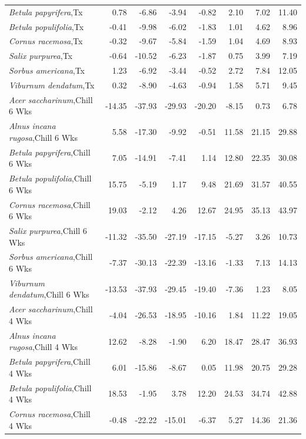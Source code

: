 \documentclass{article}\usepackage[]{graphicx}\usepackage[]{color}
\begin{document}
\begin{longtable}{lrrrrrrr}
  \textit{Betula papyrifera},Tx & 0.78 & -6.86 & -3.94 & -0.82 & 2.10 & 7.02 & 11.40 \\ 
  \textit{Betula populifolia},Tx & -0.41 & -9.98 & -6.02 & -1.83 & 1.01 & 4.62 & 8.96 \\ 
  \textit{Cornus racemosa},Tx & -0.32 & -9.67 & -5.84 & -1.59 & 1.04 & 4.69 & 8.93 \\ 
  \textit{Salix purpurea},Tx & -0.64 & -10.52 & -6.23 & -1.87 & 0.75 & 3.99 & 7.19 \\ 
  \textit{Sorbus americana},Tx & 1.23 & -6.92 & -3.44 & -0.52 & 2.72 & 7.84 & 12.05 \\ 
  \textit{Viburnum dendatum},Tx & 0.32 & -8.90 & -4.63 & -0.94 & 1.58 & 5.71 & 9.45 \\ 
  \textit{Acer saccharinum},Chill 6 Wks & -14.35 & -37.93 & -29.93 & -20.20 & -8.15 & 0.73 & 6.78 \\ 
  \textit{Alnus incana rugosa},Chill 6 Wks & 5.58 & -17.30 & -9.92 & -0.51 & 11.58 & 21.15 & 29.88 \\ 
  \textit{Betula papyrifera},Chill 6 Wks & 7.05 & -14.91 & -7.41 & 1.14 & 12.80 & 22.35 & 30.08 \\ 
  \textit{Betula populifolia},Chill 6 Wks & 15.75 & -5.19 & 1.17 & 9.48 & 21.69 & 31.57 & 40.55 \\ 
  \textit{Cornus racemosa},Chill 6 Wks & 19.03 & -2.12 & 4.26 & 12.67 & 24.95 & 35.13 & 43.97 \\ 
  \textit{Salix purpurea},Chill 6 Wks & -11.32 & -35.50 & -27.19 & -17.15 & -5.27 & 3.26 & 10.73 \\ 
  \textit{Sorbus americana},Chill 6 Wks & -7.37 & -30.13 & -22.39 & -13.16 & -1.33 & 7.13 & 14.13 \\ 
  \textit{Viburnum dendatum},Chill 6 Wks & -13.53 & -37.93 & -29.45 & -19.40 & -7.36 & 1.23 & 8.05 \\ 
  \textit{Acer saccharinum},Chill 4 Wks & -4.04 & -26.53 & -18.95 & -10.16 & 1.84 & 11.22 & 19.05 \\ 
  \textit{Alnus incana rugosa},Chill 4 Wks & 12.62 & -8.28 & -1.90 & 6.20 & 18.47 & 28.47 & 36.93 \\ 
  \textit{Betula papyrifera},Chill 4 Wks & 6.01 & -15.86 & -8.67 & 0.05 & 11.98 & 20.75 & 29.28 \\ 
  \textit{Betula populifolia},Chill 4 Wks & 18.53 & -1.95 & 3.78 & 12.20 & 24.53 & 34.74 & 42.88 \\ 
  \textit{Cornus racemosa},Chill 4 Wks & -0.48 & -22.22 & -15.01 & -6.37 & 5.27 & 14.36 & 21.36 \\ 

\end{longtable}
\end{document}
